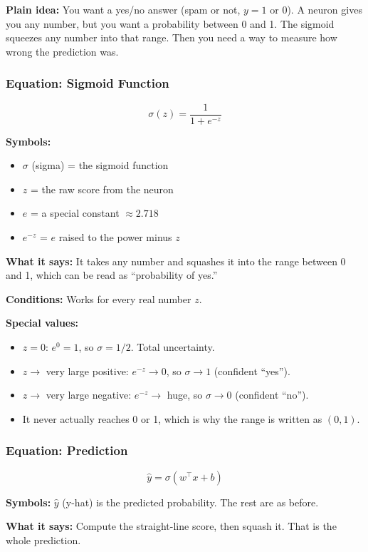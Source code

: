 \textbf{Plain idea:} You want a yes/no answer (spam or not, $y = 1$ or $0$). A neuron gives you any number, but you want a probability between 0 and 1. The sigmoid squeezes any number into that range. Then you need a way to measure how wrong the prediction was.

\subsubsection*{Equation: Sigmoid Function}

\[
\sigma(z) = \frac{1}{1 + e^{-z}}
\]

\textbf{Symbols:}
\begin{itemize}
  \item $\sigma$ (sigma) = the sigmoid function
  \item $z$ = the raw score from the neuron
  \item $e$ = a special constant $\approx 2.718$
  \item $e^{-z}$ = $e$ raised to the power minus $z$
\end{itemize}

\textbf{What it says:} It takes any number and squashes it into the range between 0 and 1, which can be read as ``probability of yes.''

\textbf{Conditions:} Works for every real number $z$.

\textbf{Special values:}
\begin{itemize}
  \item $z = 0$: $e^0 = 1$, so $\sigma = 1/2$. Total uncertainty.
  \item $z \to$ very large positive: $e^{-z} \to 0$, so $\sigma \to 1$ (confident ``yes'').
  \item $z \to$ very large negative: $e^{-z} \to$ huge, so $\sigma \to 0$ (confident ``no'').
  \item It never actually reaches 0 or 1, which is why the range is written as $(0, 1)$.
\end{itemize}

\subsubsection*{Equation: Prediction}

\[
\hat{y} = \sigma(w^\top x + b)
\]

\textbf{Symbols:} $\hat{y}$ (y-hat) is the predicted probability. The rest are as before.

\textbf{What it says:} Compute the straight-line score, then squash it. That is the whole prediction.

